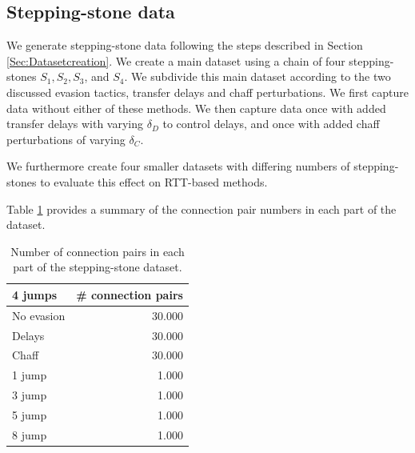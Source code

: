 \documentclass[runningheads]{llncs}\usepackage[]{graphicx}\usepackage[]{color}
\begin{document}
\subsection{Stepping-stone data}

We generate stepping-stone data following the steps described in Section \ref{Sec:Datasetcreation}. We create a main dataset using a chain of four stepping-stones $S_1, S_2, S_3$, and $S_4$. We subdivide this main dataset according to the two discussed evasion tactics, transfer delays and chaff perturbations. We first capture data without either of these methods. We then capture data once with added transfer delays with varying $\delta_D$ to control delays, and once with added chaff perturbations of varying $\delta_C$. %

We furthermore create four smaller datasets with differing numbers of stepping-stones to evaluate this effect on RTT-based methods.

Table \ref{Tab:MalData} provides a summary of the connection pair numbers in each part of the dataset.
\begin{table}
\centering
\begin{tabular}{l|r}
4 jumps&\# connection pairs \\ \hline
No evasion& 30.000\\ \hline
Delays& 30.000 \\ \hline
Chaff&30.000 \\ \hline
\hline
1 jump& 1.000\\ \hline
3 jump& 1.000 \\ \hline
5 jump& 1.000 \\ \hline
8 jump& 1.000 \\ \hline
\end{tabular}
\caption{Number of connection pairs in each part of the stepping-stone dataset.}\label{Tab:MalData}
\end{table}


\end{document}
